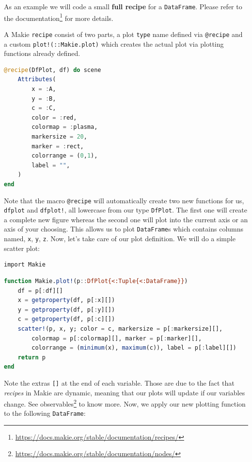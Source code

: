 \documentclass[
  notoc %
]{tufte-book}
\DeclareRobustCommand{\href}[2]{#2\footnote{\url{#1}}}
\newcommand{\passthrough}[1]{#1}
\begin{document}
As an example we will code a small \textbf{full recipe} for a
\passthrough{\lstinline!DataFrame!}. Please refer to the
\href{https://docs.makie.org/stable/documentation/recipes/}{documentation}
for more details.

A Makie \passthrough{\lstinline!recipe!} consist of two parts, a plot
\passthrough{\lstinline!type!} name defined via
\passthrough{\lstinline!@recipe!} and a custom
\passthrough{\lstinline"plot!(::Makie.plot)"} which creates the actual
plot via plotting functions already defined.

\begin{lstlisting}[language=Julia]
@recipe(DfPlot, df) do scene
    Attributes(
        x = :A,
        y = :B,
        c = :C,
        color = :red,
        colormap = :plasma,
        markersize = 20,
        marker = :rect,
        colorrange = (0,1),
        label = "",
    )
end
\end{lstlisting}

Note that the macro \passthrough{\lstinline!@recipe!} will automatically
create two new functions for us, \passthrough{\lstinline!dfplot!} and
\passthrough{\lstinline"dfplot!"}, all lowercase from our type
\passthrough{\lstinline!DfPlot!}. The first one will create a complete
new figure whereas the second one will plot into the current axis or an
axis of your choosing. This allows us to plot
\passthrough{\lstinline!DataFrame!}s which contains columns named,
\passthrough{\lstinline!x!}, \passthrough{\lstinline!y!},
\passthrough{\lstinline!z!}. Now, let's take care of our plot
definition. We will do a simple scatter plot:

\begin{lstlisting}
import Makie
\end{lstlisting}

\begin{lstlisting}[language=Julia]
function Makie.plot!(p::DfPlot{<:Tuple{<:DataFrame}})
    df = p[:df][]
    x = getproperty(df, p[:x][])
    y = getproperty(df, p[:y][])
    c = getproperty(df, p[:c][])
    scatter!(p, x, y; color = c, markersize = p[:markersize][],
        colormap = p[:colormap][], marker = p[:marker][],
        colorrange = (minimum(x), maximum(c)), label = p[:label][])
    return p
end
\end{lstlisting}

Note the extras \passthrough{\lstinline![]!} at the end of each
variable. Those are due to the fact that \emph{recipes} in Makie are
dynamic, meaning that our plots will update if our variables change. See
\href{https://docs.makie.org/stable/documentation/nodes/}{observables}
to know more. Now, we apply our new plotting function to the following
\passthrough{\lstinline!DataFrame!}:
\end{document}
